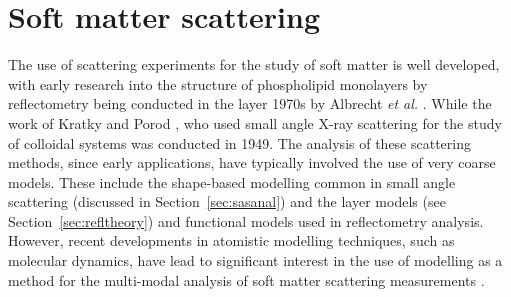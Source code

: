 \section{Soft matter scattering}

The use of scattering experiments for the study of soft matter is well developed, with early research into the structure of phospholipid monolayers by reflectometry being conducted in the layer 1970s by Albrecht \emph{et al.} \cite{albrecht_polymorphism_1978}.
While the work of Kratky and Porod \cite{kratky_diffuse_1949}, who used small angle X-ray scattering for the study of colloidal systems was conducted in 1949.
The analysis of these scattering methods, since early applications, have typically involved the use of very coarse models.
These include the shape-based modelling common in small angle scattering (discussed in Section~\ref{sec:sasanal}) \cite{hassan_small_2003} and the layer models (see Section~\ref{sec:refltheory}) \cite{campbell_structure_2018} and functional models \cite{lu_analysis_1996} used in reflectometry analysis.
However, recent developments in atomistic modelling techniques, such as molecular dynamics, have lead to significant interest in the use of modelling as a method for the multi-modal analysis of soft matter scattering measurements \cite{scoppola_combining_2018}.
